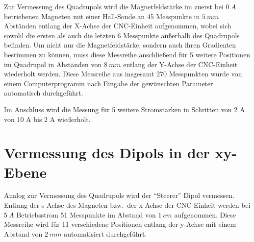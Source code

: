 \documentclass[bigchapter,colorback,accentcolor=tud4b,linedtoc,11pt]{tudreport}
\begin{document}
\begin{center}
\begin{figure}[H]
\end{figure}
\end{center}

Zur Vermessung des Quadrupols wird die Magnetfeldstärke im zuerst bei $0~A$ betriebenen Magneten mit einer Hall-Sonde an 45 Messpunkte in $5~mm$ Abständen entlang der X-Achse der CNC-Einheit aufgenommen, wobei sich sowohl die ersten als auch die letzten 6 Messpunkte außerhalb des Quadrupols befinden. Um nicht nur die Magnetfeldstärke, sondern auch ihren Gradienten bestimmen zu können, muss diese Messreihe anschließend für 5 weitere Positionen im Quadrupol in Abständen von $8~mm$ entlang der Y-Achse der CNC-Einheit wiederholt werden. Diese Messreihe aus insgesamt 270 Messpunkten wurde von einem Computerprogramm nach Eingabe der gewünschten Parameter automatisch durchgeführt.

Im Anschluss wird die Messung für 5 weitere Stromstärken in Schritten von 2 A von 10 A bis 2 A wiederholt.

\section{Vermessung des Dipols in der xy-Ebene}
Analog zur Vermessung des Quadrupols wird der "`Steerer"' Dipol vermessen. Entlang der s-Achse des Magneten bzw.\ der x-Achse der CNC-Einheit werden bei $5~A$ Betriebsstrom 51 Messpunkte im Abstand von $1~cm$ aufgenommen. Diese Messreihe wird für 11 verschiedene Positionen entlang der y-Achse mit einem Abstand von $2~mm$ automatisiert durchgeführt.
\end{document}
